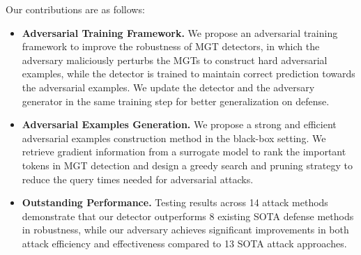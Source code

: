 Our contributions are as follows: 
\begin{itemize}
    \item \textbf{Adversarial Training Framework.} 
    We propose an adversarial training framework \modelname 
    to improve the robustness of MGT detectors, in which the adversary maliciously perturbs the MGTs to construct hard adversarial examples, while the detector is trained to maintain correct prediction towards the adversarial examples.
    We update the detector and the adversary generator in the same training step for better generalization on defense.
    \item 
    \textbf{Adversarial Examples Generation.}
    We propose a strong and efficient adversarial examples construction method in the black-box setting. 
    We retrieve gradient information from a surrogate model to rank the important tokens in MGT detection and design a greedy search and pruning strategy to reduce the query times needed for adversarial attacks.
    \item 
    \textbf{Outstanding Performance.} Testing results across 14 attack methods demonstrate that our detector outperforms 8 existing SOTA defense methods in robustness, while our adversary achieves significant improvements in both attack efficiency and effectiveness compared to 13 SOTA attack approaches. 
\end{itemize}

